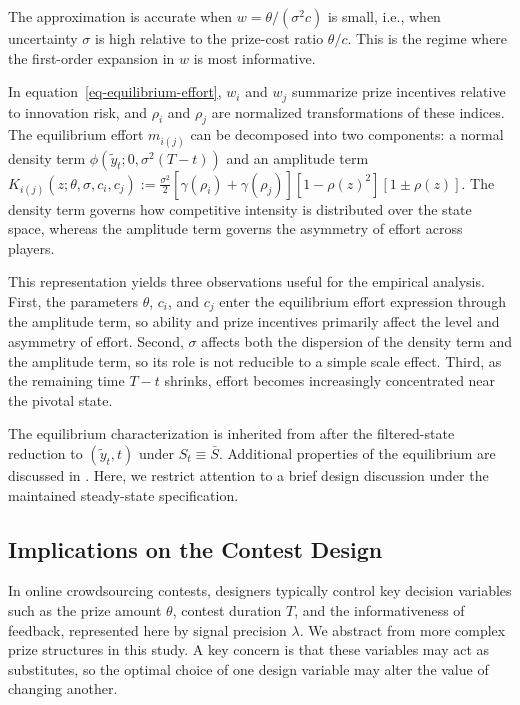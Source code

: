 \documentclass[mnsc]{informs3}
\begin{document}
\begin{remark}
The approximation is accurate when $w=\theta/(\sigma^2 c)$ is small, i.e., when uncertainty $\sigma$ is high relative to the prize-cost ratio $\theta/c$. 
This is the regime where the first-order expansion in $w$ is most informative.
\end{remark}

In equation~\eqref{eq-equilibrium-effort}, $w_i$ and $w_j$ summarize prize incentives relative to innovation risk, and $\rho_i$ and $\rho_j$ are normalized transformations of these indices.
The equilibrium effort $m_{i(j)}$ can be decomposed into two components: a normal density term $\phi(\tilde{y}_t; 0, \sigma^2(T-t))$ and an amplitude term $K_{i(j)}(z;\theta,\sigma,c_i,c_j)
:= \frac{\sigma^2}{2}\left[\gamma(\rho_i)+\gamma(\rho_j)\right]\left[1-\rho(z)^2\right]\left[1\pm\rho(z)\right]$.
The density term governs how competitive intensity is distributed over the state space, whereas the amplitude term governs the asymmetry of effort across players.

This representation yields three observations useful for the empirical analysis.
First, the parameters $\theta$, $c_i$, and $c_j$ enter the equilibrium effort expression through the amplitude term, so ability and prize incentives primarily affect the level and asymmetry of effort.
Second, $\sigma$ affects both the dispersion of the density term and the amplitude term, so its role is not reducible to a simple scale effect.
Third, as the remaining time $T-t$ shrinks, effort becomes increasingly concentrated near the pivotal state.

The equilibrium characterization is inherited from \citet{Ryvkin2022Fight} after the filtered-state reduction to $(\tilde y_t,t)$ under $S_t\equiv\bar S$.
Additional properties of the equilibrium are discussed in \citet{Ryvkin2022Fight}.
Here, we restrict attention to a brief design discussion under the maintained steady-state specification.



\subsection{Implications on the Contest Design}\label{sect-design}

In online crowdsourcing contests, designers typically control key decision variables such as the prize amount $\theta$, contest duration $T$, and the informativeness of feedback, represented here by signal precision $\lambda$.
We abstract from more complex prize structures in this study.
A key concern is that these variables may act as substitutes, so the optimal choice of one design variable may alter the value of changing another.
\end{document}
